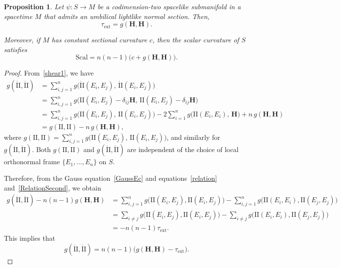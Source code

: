 \documentclass[11pt]{article}
\numberwithin{equation}{section}
\newtheorem{proposition}[theorem]{Proposition}
\begin{document}
\begin{proposition}\label{propo2}
	Let \(\psi\colon S\to M\) be a codimension-two spacelike submanifold in a spacetime \(M\) that admits an umbilical lightlike normal section. Then,
	\begin{equation}\label{ExtrinsicScalarH}
		\tau_{\mathrm{ext}} = g(\mathbf{H}, \mathbf{H}).
	\end{equation}
	
	Moreover, if \(M\) has constant sectional curvature \(c\), then the scalar curvature of $S$ satisfies
	\begin{equation}\label{Scal}
		\mathrm{Scal} = n(n-1)\bigl(c + g(\mathbf{H}, \mathbf{H})\bigr).
	\end{equation}
\end{proposition}
\begin{proof}
	From~\eqref{shear1}, we have
	\begin{align}
		g(\mathring{\mathrm{II}}, \mathring{\mathrm{II}})
		&= \sum_{i,j=1}^n g\bigl(\mathring{\mathrm{II}}(E_i, E_j),\, \mathring{\mathrm{II}}(E_i, E_j)\bigr) \nonumber \\
		&= \sum_{i,j=1}^n g\bigl(\mathrm{II}(E_i, E_j) - \delta_{ij} \mathbf{H},\, \mathrm{II}(E_i, E_j) - \delta_{ij} \mathbf{H}\bigr) \nonumber \\
		&= \sum_{i,j=1}^n g\bigl(\mathrm{II}(E_i, E_j),\, \mathrm{II}(E_i, E_j)\bigr) - 2\sum_{i=1}^n g\bigl(\mathrm{II}(E_i, E_i),\, \mathbf{H}\bigr) + n\, g(\mathbf{H}, \mathbf{H}) \nonumber \\
		&= g(\mathrm{II}, \mathrm{II}) - n\, g(\mathbf{H}, \mathbf{H}), \label{RelationSecond}
	\end{align}
	where $g(\mathrm{II}, \mathrm{II}) = \sum_{i,j=1}^n g\bigl(\mathrm{II}(E_i, E_j),\, \mathrm{II}(E_i, E_j)\bigr)$, and similarly for $g(\mathring{\mathrm{II}}, \mathring{\mathrm{II}})$. Both $g(\mathrm{II}, \mathrm{II})$ and $g(\mathring{\mathrm{II}}, \mathring{\mathrm{II}})$ are independent of the choice of local orthonormal frame $\{E_1, \ldots, E_n\}$ on $S$.
	
	Therefore, from the Gauss equation~\eqref{GaussEc} and equations~\eqref{relation} and~\eqref{RelationSecond}, we obtain
	\begin{align*}
		g(\mathring{\mathrm{II}}, \mathring{\mathrm{II}}) - n(n-1) g(\mathbf{H}, \mathbf{H}) 
		&= \sum_{i,j=1}^n g\bigl(\mathrm{II}(E_i, E_j), \mathrm{II}(E_i, E_j)\bigr) - \sum_{i,j=1}^n g\bigl(\mathrm{II}(E_i, E_i), \mathrm{II}(E_j, E_j)\bigr) \\
		&= \sum_{i \neq j} g\bigl(\mathrm{II}(E_i, E_j), \mathrm{II}(E_i, E_j)\bigr) - \sum_{i \neq j} g\bigl(\mathrm{II}(E_i, E_i), \mathrm{II}(E_j, E_j)\bigr) \\
		&= -n(n-1) \tau_{\mathrm{ext}}.
	\end{align*}
	This implies that
	\begin{equation} \label{RelationSecondBis}
		g(\mathring{\mathrm{II}}, \mathring{\mathrm{II}}) = n(n-1) \big( g(\mathbf{H}, \mathbf{H}) - \tau_{\mathrm{ext}} \big).
	\end{equation}
	

\end{proof}
\end{document}
